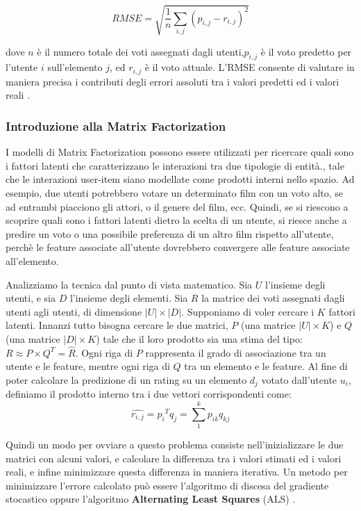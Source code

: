 \documentclass[11pt]{article}
\begin{document}
\[ RMSE=\sqrt{\frac{1}{n}\sum_{{i,j}}(p_{i,j}-r_{i,j})^2} \]

dove $n$ è il numero totale dei voti assegnati dagli utenti,$p_{i,j}$ è il voto predetto per l'utente $i$ sull'elemento $j$, ed $r_{i,j}$ è il voto attuale. L'RMSE consente di valutare in maniera precisa i contributi degli errori assoluti tra i valori predetti ed i valori reali \cite{Su:2009:SCF:1592474.1722966}.
 
\subsubsection{Introduzione alla Matrix Factorization}
I modelli di Matrix Factorization possono essere utilizzati per ricercare quali sono i fattori latenti che caratterizzano le interazioni tra due tipologie di entità., tale che le interazioni user-item siano modellate come prodotti interni nello spazio. Ad esempio, due utenti potrebbero votare un determinato film con un voto alto, se ad entrambi piacciono gli attori, o il genere del film, ecc. Quindi, se si riescono a scoprire quali sono i fattori latenti dietro la scelta di un utente, si riesce anche a predire un voto o una possibile preferenza di un altro film rispetto all'utente, perchè le feature associate all'utente dovrebbero convergere alle feature associate all'elemento.

Analizziamo la tecnica dal punto di vista matematico. Sia $U$ l'insieme degli utenti, e sia $D$ l'insieme degli elementi. Sia $R$ la matrice dei voti assegnati dagli utenti agli utenti, di dimensione $\lvert U\rvert\times\lvert D\rvert$. Supponiamo di voler cercare i $K$ fattori latenti. Innanzi tutto bisogna cercare le due matrici, $P$ (una matrice $\lvert U\rvert\times K$) e $Q$ (una matrice $\lvert D\rvert\times K$) tale che il loro prodotto sia una stima del tipo: $R\approx P\times Q^T=\hat{R}$. Ogni riga di $P$ rappresenta il grado di associazione tra un utente e le feature, mentre ogni riga di $Q$ tra un elemento e le feature. Al fine di poter calcolare la predizione di un rating su un elemento $d_j$ votato dall'utente $u_i$, definiamo il prodotto interno tra i due vettori corrispondenti come:
\[\hat{r_{i,j}}={p_i}^Tq_j=\sum_{1}^{k}p_{ik}q_{kj}\]

Quindi un modo per ovviare a questo problema consiste nell'inizializzare le due matrici con alcuni valori, e calcolare la differenza tra i valori stimati ed i valori reali, e infine minimizzare questa differenza in maniera iterativa. Un metodo per minimizzare l'errore calcolato può essere l'algoritmo di discesa del gradiente stocastico oppure l'algoritmo \textbf{Alternating Least Squares} (ALS) \cite{Takacs:2008:MFN:1454008.1454049}.
\end{document}
